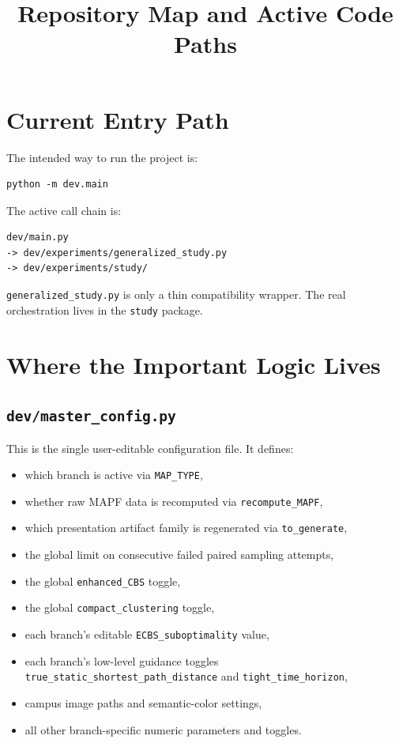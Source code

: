 \documentclass[11pt]{article}
\title{Repository Map and Active Code Paths}
\author{}
\date{}
\begin{document}
\maketitle

\section{Current Entry Path}

The intended way to run the project is:
\begin{lstlisting}
python -m dev.main
\end{lstlisting}

The active call chain is:
\begin{lstlisting}
dev/main.py
-> dev/experiments/generalized_study.py
-> dev/experiments/study/
\end{lstlisting}

\texttt{generalized\_study.py} is only a thin compatibility wrapper. The real orchestration lives in the \texttt{study} package.

\section{Where the Important Logic Lives}

\subsection{\texttt{dev/master\_config.py}}

This is the single user-editable configuration file. It defines:
\begin{itemize}[leftmargin=2em]
    \item which branch is active via \texttt{MAP\_TYPE},
    \item whether raw MAPF data is recomputed via \texttt{recompute\_MAPF},
    \item which presentation artifact family is regenerated via \texttt{to\_generate},
    \item the global limit on consecutive failed paired sampling attempts,
    \item the global \texttt{enhanced\_CBS} toggle,
    \item the global \texttt{compact\_clustering} toggle,
    \item each branch's editable \texttt{ECBS\_suboptimality} value,
    \item each branch's low-level guidance toggles \texttt{true\_static\_shortest\_path\_distance} and \texttt{tight\_time\_horizon},
    \item campus image paths and semantic-color settings,
    \item all other branch-specific numeric parameters and toggles.
\end{itemize}
\end{document}
